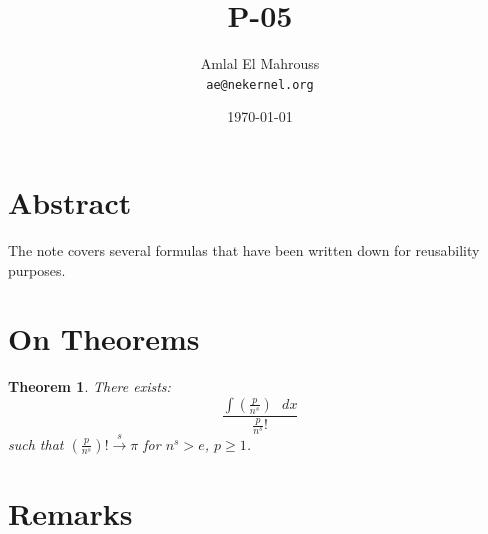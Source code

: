 \documentclass[11pt, a4paper]{article}
\title{P-05}
\author{Amlal El Mahrouss\\\texttt{ae@nekernel.org}}
\date{\today}
\theoremstyle{plain}
\newtheorem{theorem}{Theorem}[section]
\theoremstyle{definition}
\theoremstyle{remark}
\begin{document}
\twocolumn[{%
  \maketitle
  \vspace{-0.5em}
  \vspace{0.8em}
  \rule{\linewidth}{0.4pt}
  \vspace{1em}
}]

\maketitle

\section{Abstract}
The note covers several formulas that have been written down for reusability purposes.

\section{On Theorems}
\begin{theorem}
There exists:
\begin{equation}
\frac{\int (\frac{p}{n^{s}}) \text{ } dx}{\frac{p}{n^{s}}! }
\end{equation}
such that $(\frac{p}{n^{s}})! \xrightarrow{s} \pi$ for $n^{s} > e$, $p \ge 1$.
\end{theorem}

\section{Remarks}

\nocite{*}



\end{document}
